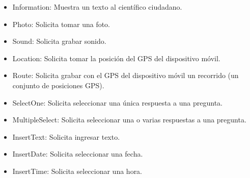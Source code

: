 \begin{itemize}

\item Information: Muestra un texto al científico ciudadano.

\item Photo: Solicita tomar una foto.

\item Sound: Solicita grabar sonido.

\item Location: Solicita tomar la posición del GPS del dispositivo móvil.

\item Route: Solicita grabar con el GPS del dispositivo móvil un recorrido (un conjunto de posiciones GPS).

\item SelectOne: Solicita seleccionar una única respuesta a una pregunta.

\item MultipleSelect: Solicita seleccionar una o varias respuestas a una pregunta.

\item InsertText: Solicita ingresar texto.

\item InsertDate: Solicita seleccionar una fecha.

\item InsertTime: Solicita seleccionar una hora.

\end{itemize}


